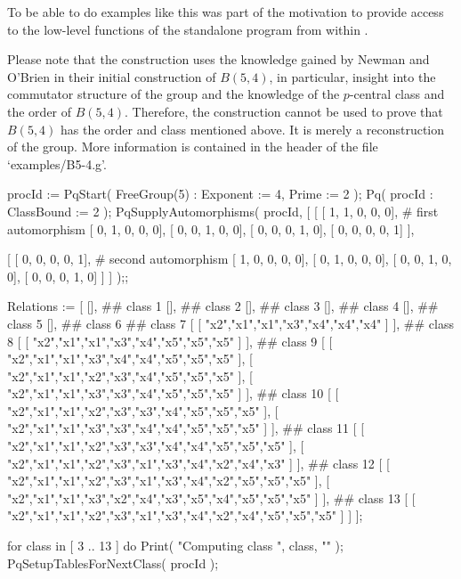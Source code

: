 To be able to do examples like this was part of the motivation to provide
access to the  low-level functions of the standalone  program from within
{\GAP}.

Please note that the construction uses the knowledge gained by Newman and
O'Brien in their  initial  construction  of  $B(5,  4)$,  in  particular,
insight into the commutator structure of the group and the  knowledge  of
the $p$-central  class  and  the  order  of  $B(5,  4)$.  Therefore,  the
construction cannot be used to prove that $B(5, 4)$  has  the  order  and
class mentioned above. It is merely a reconstruction of the  group.  More
information is contained in the header of the file `examples/B5-4.g'.

\goodbreak%
\begintt
procId := PqStart( FreeGroup(5) : Exponent := 4, Prime := 2 );
Pq( procId : ClassBound := 2 );
PqSupplyAutomorphisms( procId,
      [
        [ [ 1, 1, 0, 0, 0],      # first automorphism
          [ 0, 1, 0, 0, 0],
          [ 0, 0, 1, 0, 0],
          [ 0, 0, 0, 1, 0],
          [ 0, 0, 0, 0, 1] ],

        [ [ 0, 0, 0, 0, 1],      # second automorphism
          [ 1, 0, 0, 0, 0],
          [ 0, 1, 0, 0, 0],
          [ 0, 0, 1, 0, 0],
          [ 0, 0, 0, 1, 0] ]
                             ] );;

Relations :=
  [ [],          ## class 1
    [],          ## class 2
    [],          ## class 3
    [],          ## class 4
    [],          ## class 5
    [],          ## class 6
    ## class 7     
    [ [ "x2","x1","x1","x3","x4","x4","x4" ] ],
    ## class 8
    [ [ "x2","x1","x1","x3","x4","x5","x5","x5" ] ],
    ## class 9
    [ [ "x2","x1","x1","x3","x4","x4","x5","x5","x5" ],
      [ "x2","x1","x1","x2","x3","x4","x5","x5","x5" ],
      [ "x2","x1","x1","x3","x3","x4","x5","x5","x5" ] ],
    ## class 10
    [ [ "x2","x1","x1","x2","x3","x3","x4","x5","x5","x5" ],
      [ "x2","x1","x1","x3","x3","x4","x4","x5","x5","x5" ] ],
    ## class 11
    [ [ "x2","x1","x1","x2","x3","x3","x4","x4","x5","x5","x5" ],
      [ "x2","x1","x1","x2","x3","x1","x3","x4","x2","x4","x3" ] ],
    ## class 12
    [ [ "x2","x1","x1","x2","x3","x1","x3","x4","x2","x5","x5","x5" ],
      [ "x2","x1","x1","x3","x2","x4","x3","x5","x4","x5","x5","x5" ] ],
    ## class 13
    [ [ "x2","x1","x1","x2","x3","x1","x3","x4","x2","x4","x5","x5","x5" 
        ] ]
];

for class in [ 3 .. 13 ] do
    Print( "Computing class ", class, "\n" );
    PqSetupTablesForNextClass( procId );


